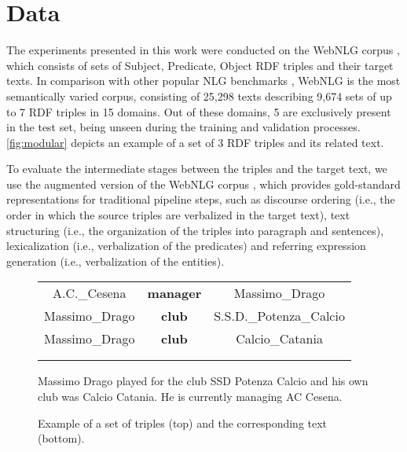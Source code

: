 \documentclass[11pt,a4paper]{article}
\begin{document}
\section{Data}





The experiments presented in this work were conducted on the WebNLG corpus \cite{claire2017,claire2017b}, which consists of sets of  Subject, Predicate, Object  RDF triples and their target texts. In comparison with other popular NLG benchmarks \cite{belz2011,novikova2017b,mille2018}, WebNLG is the most semantically varied corpus, consisting of 25,298 texts describing 9,674 sets of up to 7 RDF triples in 15 domains. Out of these domains, 5 are exclusively present in the test set, being unseen during the training and validation processes. \autoref{fig:modular} depicts an example of a set of 3 RDF triples and its related text.

To evaluate the intermediate stages between the triples and the target text, we use the augmented version of the WebNLG corpus \citep{ferreira2018b}, which provides gold-standard representations for traditional pipeline steps, such as discourse ordering (i.e., the order in which the source triples are verbalized in the target text), text structuring (i.e., the organization of the triples into paragraph and sentences), lexicalization (i.e., verbalization of the predicates) and referring expression generation (i.e., verbalization of the entities).


\begin{figure}
\footnotesize{
\begin{center}
\vspace{0.1cm}

\begin{tabular}{c c c}
A.C.\_Cesena   & \textbf{manager} & Massimo\_Drago \\
Massimo\_Drago & \textbf{club} & S.S.D.\_Potenza\_Calcio \\
Massimo\_Drago & \textbf{club} & Calcio\_Catania  \\
&  &   \\
 &  &   \\
\end{tabular}
\end{center}
\vspace{0.1cm}

Massimo Drago played for the club SSD Potenza Calcio and his own club was Calcio Catania. He is currently managing AC Cesena.
\vspace{0.1cm}
\caption{Example of a set of triples (top) and the corresponding text (bottom).}
\label{fig:modular}
}
\end{figure}
\end{document}
